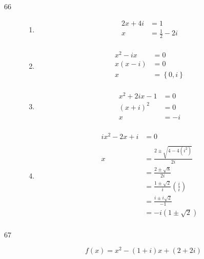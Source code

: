\documentclass{exam}
\begin{document}
    \begin{description}
      \item[66]
        \begin{enumerate}[a]

          \item 
            \begin{align*}
              2x + 4i &= 1 \\
              x       &= \boxed{\frac{1}{2} - 2i} \\
            \end{align*}

          \item 
            \begin{align*}
              x^2 - ix &= 0 \\
              x(x - i) &= 0 \\
              x        &= \boxed{\left\{ 0, i \right\}} \\
            \end{align*}

          \item 
            \begin{align*}
              x^2 + 2ix - 1 &= 0 \\
              (x + i)^2     &= 0 \\
              x             &= \boxed{-i} \\
            \end{align*}

          \item 
            \begin{align*}
              ix^2 - 2x + i &= 0 \\
              \\
              x &= \frac{2 \pm \sqrt{4 - 4(i^2)}}{2i} \\
                &= \frac{2 \pm \sqrt{8}}{2i} \\
                &= \frac{1 \pm \sqrt{2}}{i} \left( \frac{i}{i} \right) \\
                &= \frac{i \pm i \sqrt{2}}{-1} \\
                &= \boxed{- i \left( 1 \pm \sqrt{2} \right)} \\
            \end{align*}
        \end{enumerate}

    \pagebreak

      \item[67]
        \[ f(x) = x^2 - (1 + i)x + (2 + 2i) \]


\end{description}
\end{document}
